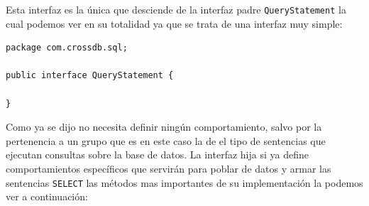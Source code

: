 Esta interfaz es la única que desciende de la interfaz padre \verb=QueryStatement= la cual podemos ver en su totalidad ya que se trata de una interfaz muy simple:

\begin{lstlisting}[title=código interfaz QueryStatement]
package com.crossdb.sql;

public interface QueryStatement {

}
\end{lstlisting}

Como ya se dijo no necesita definir ningún comportamiento, salvo por la pertenencia a un grupo que es en este caso la de el tipo de sentencias que ejecutan consultas sobre la base de datos. La interfaz hija si ya define comportamientos específicos que servirán para poblar de datos y armar las sentencias \verb=SELECT= las métodos mas importantes de su implementación la podemos ver a continuación:

